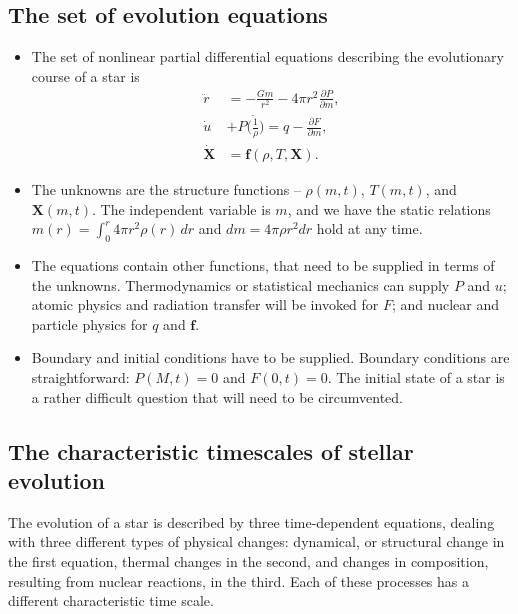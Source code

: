 \documentclass[]{article}
\newcommand{\V}[1]{\mathbf{#1}}
\newcommand{\di}{\partial} %
\begin{document}
\subsection{The set of evolution equations}
\begin{itemize}
\item The set of nonlinear partial differential equations describing the
evolutionary course of a star is
\begin{subequations}
\begin{align}\label{eq:set}
\ddot{r} &= -\frac{Gm}{r^2}-4\pi{r}^2\frac{\di{P}}{\di{m}},\\
\dot{u} &+ P\dot{\biggl(\frac{1}{\rho}\biggr)} = q - \frac{\di{F}}{\di{m}},\\
\dot{\V{X}} &= \V{f}(\rho,T,\V{X}).
\end{align}
\end{subequations}

\item The unknowns are the structure functions -- $\rho(m,t)$, $T(m,t)$, and
$\V{X}(m,t)$. The independent variable is $m$, and we have the static relations
$m(r)=\int_0^r4\pi{}r^2\rho(r)\,dr$ and $dm=4\pi\rho{}r^2dr$ hold at any time.

\item The equations contain other functions, that need to be supplied in terms
of the unknowns. Thermodynamics or statistical mechanics can supply $P$ and $u$;
atomic physics and radiation transfer will be invoked for $F$; and nuclear and
particle physics for $q$ and $\V{f}$.

\item Boundary and initial conditions have to be supplied. Boundary conditions
are straightforward: $P(M,t)=0$ and $F(0,t)=0$. The initial state of a star is a
rather difficult question that will need to be circumvented.
\end{itemize}

\subsection{The characteristic timescales of stellar evolution}
The evolution of a star is described by three time-dependent equations, dealing
with three different types of physical changes: dynamical, or structural change
in the first equation, thermal changes in the second, and changes in
composition, resulting from nuclear reactions, in the third. Each of these
processes has a different characteristic time scale.
\end{document}
